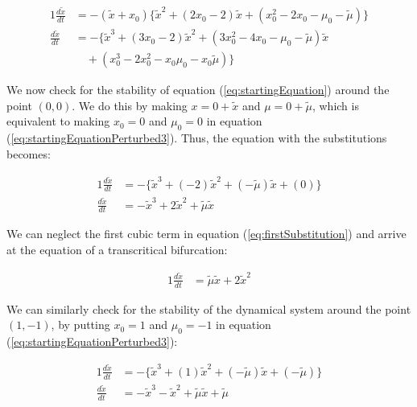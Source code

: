 \documentclass{article}
\begin{document}
	\begin{alignat}{1}
		\label{eq:startingEquationPerturbed3}
		\frac{d\tilde{x}}{dt} &= -(\tilde{x}+x_0)\{\tilde{x}^2 + (2x_0-2)\tilde{x} + (x_0^2-2x_0-\mu_0-\tilde{\mu})\} \nonumber \\		
		\frac{d\tilde{x}}{dt} &= -\{\tilde{x}^3 + (3x_0-2)\tilde{x}^2 + (3x_0^2-4x_0-\mu_0-\tilde{\mu})\tilde{x} \\&{\hspace{12pt}}   +(x_0^3 -2x_0^2 -x_0\mu_0 -x_0\tilde{\mu})\} \nonumber
	\end{alignat}	
	
	We now check for the stability of equation (\ref{eq:startingEquation}) around the point $(0,0)$. We do this by making $x = 0 + \tilde{x}$ and $\mu = 0 + \tilde{\mu}$, which is equivalent to making $x_0 = 0$ and $\mu_0 = 0$ in equation (\ref{eq:startingEquationPerturbed3}). Thus, the equation with the substitutions becomes:
	
	\begin{alignat}{1}
		\label{eq:firstSubstitution}
		\frac{d\tilde x}{dt} &= -\{\tilde{x}^3 + (-2)\tilde{x}^2 + (-\tilde{\mu})\tilde{x} +(0)\} \nonumber \\
		 \frac{d\tilde x}{dt} &= -\tilde{x}^3 + 2\tilde{x}^2 + \tilde{\mu}\tilde{x}
	\end{alignat}
	
	We can neglect the first cubic term in equation (\ref{eq:firstSubstitution}) and arrive at the equation of a transcritical bifurcation:
	
	\begin{alignat}{1}
		\frac{d\tilde{x}}{dt} &= \tilde{\mu}\tilde{x} + 2\tilde{x}^2
	\end{alignat}
	
	We can similarly check for the stability of the dynamical system around the point $(1,-1)$, by putting $x_0 = 1$ and $\mu_0 = -1$ in equation (\ref{eq:startingEquationPerturbed3}):
	
	\begin{alignat}{1}
		\frac{d\tilde{x}}{dt} &= -\{\tilde{x}^3 + (1)\tilde{x}^2 + (-\tilde{\mu})\tilde{x} + (-\tilde{\mu})\} \nonumber \\
		\frac{d\tilde{x}}{dt} &=  -\tilde{x}^3 - \tilde{x}^2 + \tilde{\mu}\tilde{x} + \tilde{\mu}
	\end{alignat}
\end{document}

